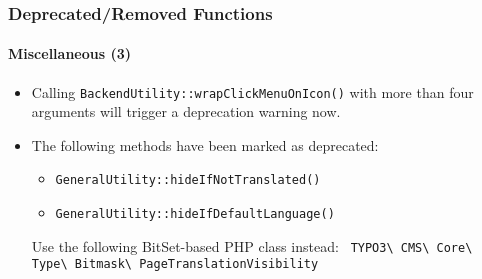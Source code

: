 %

\begin{frame}[fragile]
	\frametitle{Deprecated/Removed Functions}
	\framesubtitle{Miscellaneous (3)}

	\begin{itemize}
		\item Calling \texttt{BackendUtility::wrapClickMenuOnIcon()} with more
			than four arguments will trigger a deprecation warning now.
		\item The following methods have been marked as deprecated:
			\begin{itemize}
				\item \texttt{GeneralUtility::hideIfNotTranslated()}
				\item \texttt{GeneralUtility::hideIfDefaultLanguage()}
			\end{itemize}
			\small
				Use the following BitSet-based PHP class instead:\newline
				\smaller\texttt{
					TYPO3\textbackslash
					CMS\textbackslash
					Core\textbackslash
					Type\textbackslash
					Bitmask\textbackslash
					PageTranslationVisibility}
			\normalsize

	\end{itemize}

\end{frame}


